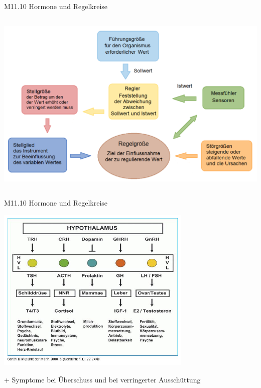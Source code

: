 \documentclass{beamer}
\begin{document}
\begin{frame}{M11.10 Hormone und Regelkreise}
\begin{columns}[c]
\begin{column}{6cm}
\begin{center}
    \includegraphics[width=1.1\textwidth]{regelkreis.png}
\end{center}

\end{column}


\end{columns}

    
\end{frame}


\begin{frame}{M11.10 Hormone und Regelkreise}
\begin{center}
    \includegraphics[width=0.7\textwidth]{hypothalamus_hypophyse.png}
\end{center}

+ Symptome bei Überschuss und bei verringerter Ausschüttung

\end{frame}
\end{document}
